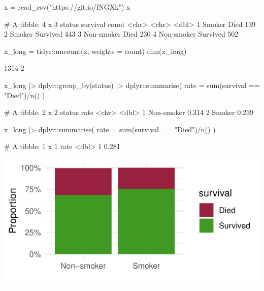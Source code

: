 \documentclass[a4paper]{article}
\begin{document}
\begin{Schunk}
\begin{Sinput}
x = read_csv("https://git.io/fNGXk")
x
\end{Sinput}
\begin{Soutput}
# A tibble: 4 x 3
  status     survival count
  <chr>      <chr>    <dbl>
1 Smoker     Died       139
2 Smoker     Survived   443
3 Non-smoker Died       230
4 Non-smoker Survived   502
\end{Soutput}
\begin{Sinput}
x_long = tidyr::uncount(x, weights = count)
dim(x_long)
\end{Sinput}
\begin{Soutput}
[1] 1314    2
\end{Soutput}
\begin{Sinput}
x_long |> 
  dplyr::group_by(status) |>
  dplyr::summarise(
		 rate = sum(survival == "Died")/n()
	)
\end{Sinput}
\begin{Soutput}
# A tibble: 2 x 2
  status      rate
  <chr>      <dbl>
1 Non-smoker 0.314
2 Smoker     0.239
\end{Soutput}
\begin{Sinput}
x_long |>
  dplyr::summarise(
  		 rate = sum(survival == "Died")/n()
  )
\end{Sinput}
\begin{Soutput}
# A tibble: 1 x 1
   rate
  <dbl>
1 0.281
\end{Soutput}


{\centering \includegraphics[width=\maxwidth]{figure/listings-unnamed-chunk-12-1} 

}

\end{Schunk}
\end{document}
